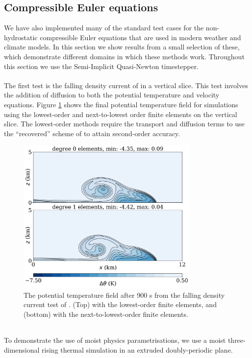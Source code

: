 \documentclass[journal abbreviation, manuscript]{copernicus}
\begin{document}
\subsection{Compressible Euler equations}
We have also implemented many of the standard test cases for the non-hydrostatic compressible Euler equations that are used in modern weather and climate models.
In this section we show results from a small selection of these, which demonstrate different domains in which these methods work.
Throughout this section we use the Semi-Implicit Quasi-Newton timestepper.
 \\
\\
The first test is the falling density current of \citet{straka1993numerical} in a vertical slice. This test involves the addition of diffusion to both the potential temperature and velocity equations.
Figure \ref{fig:straka} shows the final potential temperature field for simulations using the lowest-order and next-to-lowest order finite elements on the vertical slice.
The lowest-order methods require the transport and diffusion terms to use the ``recovered'' scheme of \citet{bendall2019recovered} to attain second-order accuracy. 
\\
\begin{figure}[htp!]
\centering
\includegraphics[width=0.8\textwidth]{figures/straka.png}
\caption{The potential temperature field after 900 s from the falling density current test of \citet{straka1993numerical}. (Top) with the lowest-order finite elements, and (bottom) with the next-to-lowest-order finite elements.
}
\label{fig:straka}
\end{figure}
\\
To demonstrate the use of moist physics parametrisations, we use a moist three-dimensional rising thermal simulation in an extruded doubly-periodic plane.
\end{document}
